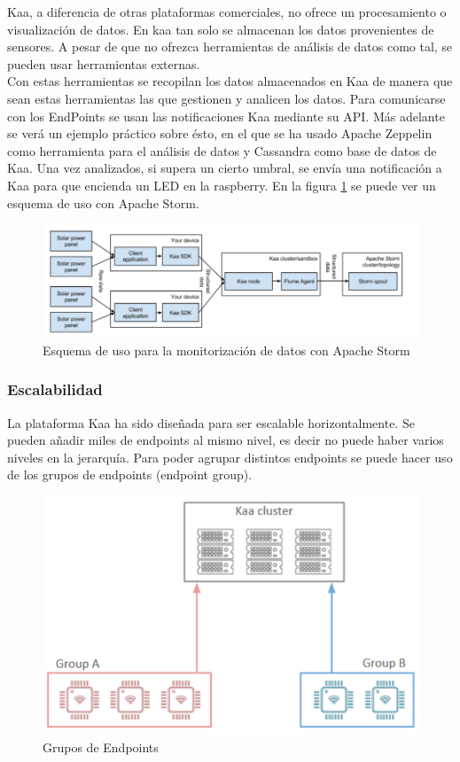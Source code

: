 \documentclass[12pt, twoside]{book}
\begin{document}
Kaa, a diferencia de otras plataformas comerciales, no ofrece un procesamiento o visualización de datos. En kaa tan solo se almacenan los datos provenientes de sensores. A pesar de que no ofrezca herramientas de análisis de datos como tal, se pueden usar herramientas externas. \\
Con estas herramientas se recopilan los datos almacenados en Kaa de manera que sean estas herramientas las que gestionen y analicen los datos. Para comunicarse con los EndPoints se usan las notificaciones Kaa mediante su API.
Más adelante se verá un ejemplo práctico sobre ésto, en el que se ha usado Apache Zeppelin como herramienta para el análisis de datos y Cassandra como base de datos de Kaa. Una vez analizados, si supera un cierto umbral, se envía una notificación a Kaa para que encienda un LED en la raspberry.
En la figura \ref{L507} se puede ver un esquema de uso con Apache Storm.
\begin{figure}[H]
\centering
\includegraphics[scale=0.6]{images/esquema_apache}
\caption{Esquema de uso para la monitorización de datos con Apache Storm}\label{L507}
\end{figure} 

\subsubsection*{Escalabilidad}
La plataforma Kaa ha sido diseñada para ser escalable horizontalmente. Se pueden añadir miles de endpoints al mismo nivel, es decir no puede haber varios niveles en la jerarquía. Para poder agrupar distintos endpoints se puede hacer uso de los grupos de endpoints (endpoint group).
\begin{figure}[H]
\centering
\includegraphics[scale=0.6]{images/endpoint_group.png}
\caption{Grupos de Endpoints}\label{L508}
\end{figure}
\end{document}
